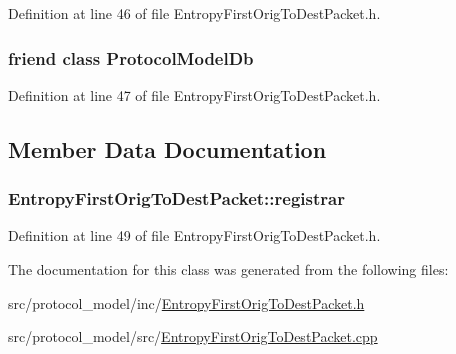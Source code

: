 Definition at line 46 of file Entropy\-First\-Orig\-To\-Dest\-Packet.\-h.

\hypertarget{class_vsid_1_1_entropy_first_orig_to_dest_packet_a3c0d389e7a9476b06313d8fb9ca9fe68}{
\subsubsection[{Protocol\-Model\-Db}]{\setlength{\rightskip}{0pt plus 5cm}friend class {\bf Protocol\-Model\-Db}\hspace{0.3cm}{\ttfamily [friend]}}}\label{class_vsid_1_1_entropy_first_orig_to_dest_packet_a3c0d389e7a9476b06313d8fb9ca9fe68}


Definition at line 47 of file Entropy\-First\-Orig\-To\-Dest\-Packet.\-h.



\subsection{Member Data Documentation}
\hypertarget{class_vsid_1_1_entropy_first_orig_to_dest_packet_a673b2b857d296aa469c0ad884059a22d}{
\subsubsection[{registrar}]{ Entropy\-First\-Orig\-To\-Dest\-Packet\-::registrar\hspace{0.3cm}{\ttfamily [static]}}}\label{class_vsid_1_1_entropy_first_orig_to_dest_packet_a673b2b857d296aa469c0ad884059a22d}


Definition at line 49 of file Entropy\-First\-Orig\-To\-Dest\-Packet.\-h.



The documentation for this class was generated from the following files\-:\begin{DoxyCompactItemize}
\item 
src/protocol\-\_\-model/inc/\hyperlink{_entropy_first_orig_to_dest_packet_8h}{Entropy\-First\-Orig\-To\-Dest\-Packet.\-h}\item 
src/protocol\-\_\-model/src/\hyperlink{_entropy_first_orig_to_dest_packet_8cpp}{Entropy\-First\-Orig\-To\-Dest\-Packet.\-cpp}\end{DoxyCompactItemize}
